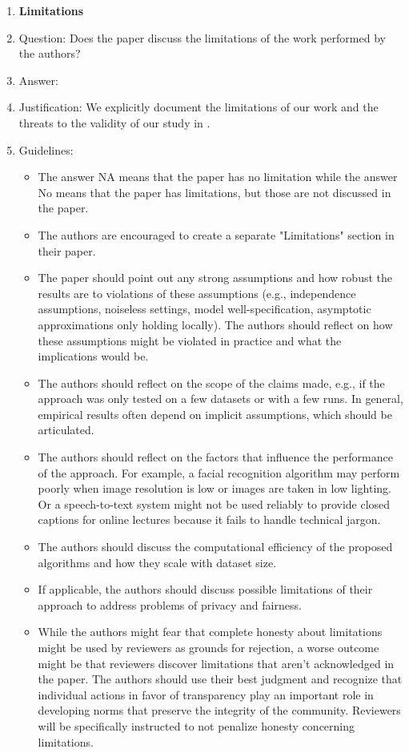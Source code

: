 \documentclass{article}
\begin{document}
\begin{enumerate}
\item {\bf Limitations}
    \item[] Question: Does the paper discuss the limitations of the work performed by the authors?
    \item[] Answer: \answerYes{} %
    \item[] Justification: We explicitly document the limitations of our work and the threats to the validity of our study in .
    \item[] Guidelines:
    \begin{itemize}
        \item The answer NA means that the paper has no limitation while the answer No means that the paper has limitations, but those are not discussed in the paper. 
        \item The authors are encouraged to create a separate "Limitations" section in their paper.
        \item The paper should point out any strong assumptions and how robust the results are to violations of these assumptions (e.g., independence assumptions, noiseless settings, model well-specification, asymptotic approximations only holding locally). The authors should reflect on how these assumptions might be violated in practice and what the implications would be.
        \item The authors should reflect on the scope of the claims made, e.g., if the approach was only tested on a few datasets or with a few runs. In general, empirical results often depend on implicit assumptions, which should be articulated.
        \item The authors should reflect on the factors that influence the performance of the approach. For example, a facial recognition algorithm may perform poorly when image resolution is low or images are taken in low lighting. Or a speech-to-text system might not be used reliably to provide closed captions for online lectures because it fails to handle technical jargon.
        \item The authors should discuss the computational efficiency of the proposed algorithms and how they scale with dataset size.
        \item If applicable, the authors should discuss possible limitations of their approach to address problems of privacy and fairness.
        \item While the authors might fear that complete honesty about limitations might be used by reviewers as grounds for rejection, a worse outcome might be that reviewers discover limitations that aren't acknowledged in the paper. The authors should use their best judgment and recognize that individual actions in favor of transparency play an important role in developing norms that preserve the integrity of the community. Reviewers will be specifically instructed to not penalize honesty concerning limitations.
    \end{itemize}


\end{enumerate}
\end{document}
